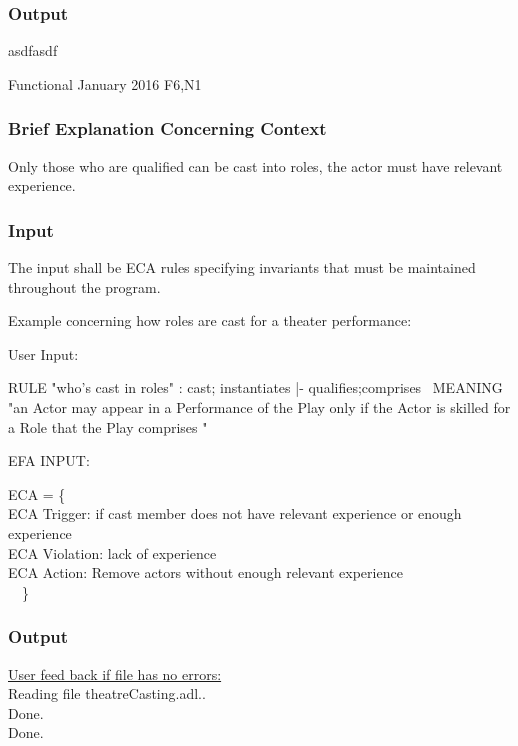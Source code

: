 \documentclass[12pt]{report}
\begin{document}
\vspace{-12pt}\subsubsection*{Output}

asdfasdf

{Functional}
{January 2016}
{F6,N1}
\vspace{-12pt}\subsubsection*{Brief Explanation Concerning Context}
Only those who are qualified can be cast into roles, the actor must have 
relevant experience.
\vspace{-12pt}\subsubsection*{Input}
The input shall be ECA rules specifying invariants that must be maintained 
throughout the program.

\noindent
Example concerning how roles are cast for a theater performance:

\noindent
User Input:

\noindent
   RULE "who's cast in roles" : cast; instantiates |- qualifies;comprises~
   MEANING "an Actor may appear in a Performance of the Play only if the Actor 
   is skilled for a Role that the Play comprises "


\noindent
EFA INPUT:
\begin{tabbing}
   ECA = \{  \\ \tabb \tabb ECA Trigger: if cast member does not have relevant 
   experience or 
   enough experience \\
\tabb \tabb  ECA Violation: lack of experience \\
\tabb \tabb  ECA Action: Remove actors without enough relevant experience \\ 
\tabb \ \ \}
\end{tabbing}
\vspace{-12pt}\subsubsection*{Output}
\underline{User feed back if file has no errors:}\\
Reading file theatreCasting.adl.. \\
Done. \\
Done. \\
\end{document}
